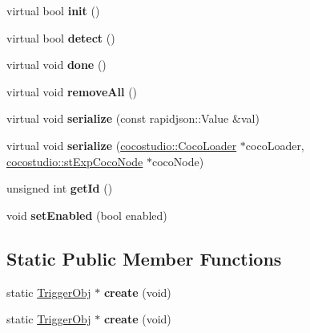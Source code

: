 \begin{DoxyCompactItemize}
virtual bool {\bfseries init} ()
\item 
\mbox{\label{classcocostudio_1_1TriggerObj_a84044a1dc6dc218a067c1d9fca9157c1}} 
virtual bool {\bfseries detect} ()
\item 
\mbox{\label{classcocostudio_1_1TriggerObj_ae5bb5ff7d09d2df7c15565d5620bcf67}} 
virtual void {\bfseries done} ()
\item 
\mbox{\label{classcocostudio_1_1TriggerObj_aa00d7d0262ba39904f768050ba63c6a2}} 
virtual void {\bfseries remove\+All} ()
\item 
\mbox{\label{classcocostudio_1_1TriggerObj_a18a7118d886ea2d9c82867e26338a6c6}} 
virtual void {\bfseries serialize} (const rapidjson\+::\+Value \&val)
\item 
\mbox{\label{classcocostudio_1_1TriggerObj_a2e0e66dd222ce6624dd7dc37e45f2cc5}} 
virtual void {\bfseries serialize} (\hyperlink{classcocostudio_1_1CocoLoader}{cocostudio\+::\+Coco\+Loader} $\ast$coco\+Loader, \hyperlink{structcocostudio_1_1stExpCocoNode}{cocostudio\+::st\+Exp\+Coco\+Node} $\ast$coco\+Node)
\item 
\mbox{\label{classcocostudio_1_1TriggerObj_a0e275c0c776d8804eb293dc03b0c43fd}} 
unsigned int {\bfseries get\+Id} ()
\item 
\mbox{\label{classcocostudio_1_1TriggerObj_a465c69ec271421af612746fb93482247}} 
void {\bfseries set\+Enabled} (bool enabled)
\end{DoxyCompactItemize}
\subsection*{Static Public Member Functions}
\begin{DoxyCompactItemize}
\item 
\mbox{\label{classcocostudio_1_1TriggerObj_af785b31bc21abe2435872b258dae96a5}} 
static \hyperlink{classcocostudio_1_1TriggerObj}{Trigger\+Obj} $\ast$ {\bfseries create} (void)
\item 
\mbox{\label{classcocostudio_1_1TriggerObj_a6a3da0d5b2ad93e1aa7ab237b7cadd07}} 
static \hyperlink{classcocostudio_1_1TriggerObj}{Trigger\+Obj} $\ast$ {\bfseries create} (void)
\end{DoxyCompactItemize}


